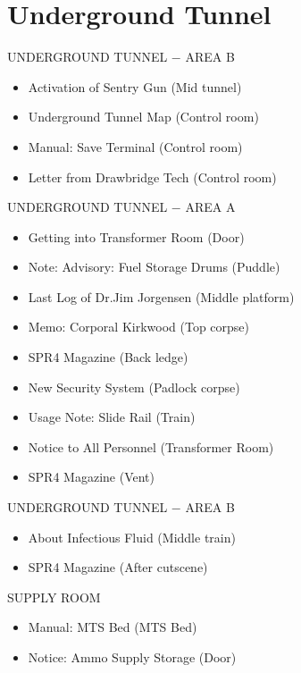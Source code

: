 \chapter{Underground Tunnel}

\begin{subregion}{UNDERGROUND TUNNEL $\boldsymbol{-}$ AREA B}
    \begin{itemize}
        \item Activation of Sentry Gun (Mid tunnel)
        \item Underground Tunnel Map (Control room)
        \item Manual: Save Terminal (Control room)
        \item Letter from Drawbridge Tech (Control room)
    \end{itemize}
\end{subregion}

\begin{subregion}{UNDERGROUND TUNNEL $\boldsymbol{-}$ AREA A}
    \begin{itemize}
        \item Getting into Transformer Room (Door)
        \item Note: Advisory: Fuel Storage Drums (Puddle)
        \item Last Log of Dr.Jim Jorgensen (Middle platform)
        \item Memo: Corporal Kirkwood (Top corpse)
        \item SPR4 Magazine (Back ledge)
        \item New Security System (Padlock corpse)
        \item Usage Note: Slide Rail (Train)
        \item Notice to All Personnel (Transformer Room)
        \item SPR4 Magazine (Vent)
    \end{itemize}
\end{subregion}

\begin{subregion}{UNDERGROUND TUNNEL $\boldsymbol{-}$ AREA B}
    \begin{itemize}
        \item About Infectious Fluid (Middle train)
        \item SPR4 Magazine (After cutscene)
    \end{itemize}
\end{subregion}

\begin{subregion}{SUPPLY ROOM}
    \begin{itemize}
        \item Manual: MTS Bed (MTS Bed)        
        \item Notice: Ammo Supply Storage (Door)
    \end{itemize}
\end{subregion}

